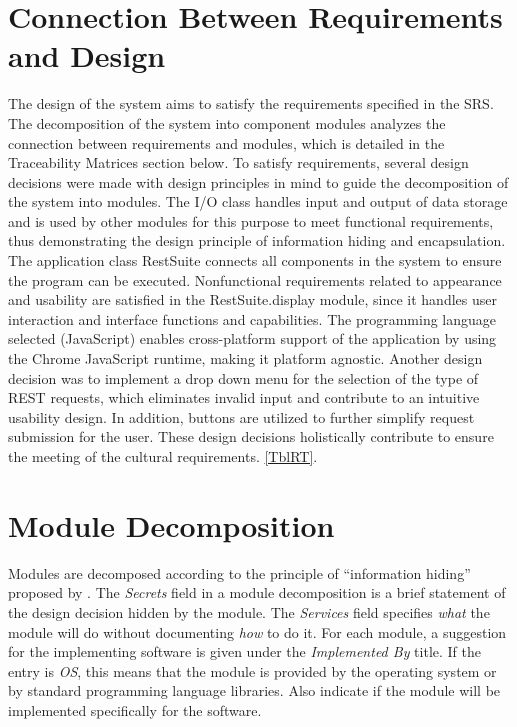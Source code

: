 \documentclass[12pt, titlepage]{article}
\begin{document}
\section{Connection Between Requirements and Design} \label{SecConnection}
The design of the system aims to satisfy the requirements specified in the SRS. The decomposition of the system into component modules analyzes the connection between requirements and modules, which is detailed in the Traceability Matrices section below. To satisfy requirements, several design decisions were made with design principles in mind to guide the decomposition of the system into modules. The I/O class handles input and output of data storage and is used by other modules for this purpose to meet functional requirements, thus demonstrating the design principle of information hiding and encapsulation. The application class RestSuite connects all components in the system to ensure the program can be executed. Nonfunctional requirements related to appearance and usability are satisfied in the RestSuite.display module, since it handles user interaction and interface functions and capabilities. The programming language selected (JavaScript) enables cross-platform support of the application by using the Chrome JavaScript runtime, making it platform agnostic. Another design decision was to implement a drop down menu for the selection of the type of REST requests, which eliminates invalid input and contribute to an intuitive usability design. In addition, buttons are utilized to further simplify request submission for the user. These design decisions holistically contribute to ensure the meeting of the cultural requirements.
\ref{TblRT}.


\section{Module Decomposition} \label{SecMD}

Modules are decomposed according to the principle of ``information hiding''
proposed by \citet{ParnasEtAl1984}. The \emph{Secrets} field in a module
decomposition is a brief statement of the design decision hidden by the
module. The \emph{Services} field specifies \emph{what} the module will do
without documenting \emph{how} to do it. For each module, a suggestion for the
implementing software is given under the \emph{Implemented By} title. If the
entry is \emph{OS}, this means that the module is provided by the operating
system or by standard programming language libraries.  Also indicate if the
module will be implemented specifically for the software.
\end{document}
